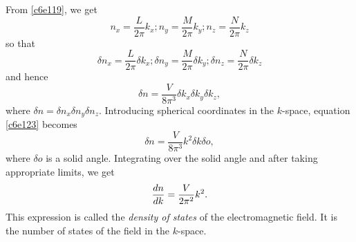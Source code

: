 \begin{enumerate}
From \eqref{c6e119}, we get
\[
n_x = \frac{L}{2\pi}k_x; n_y = \frac{M}{2\pi}k_y; n_z = \frac{N}{2\pi}k_z
\]
so that
\[
\delta n_x = \frac{L}{2\pi}\delta k_x; \delta n_y = \frac{M}{2\pi}\delta k_y; 
\delta n_z = \frac{N}{2\pi}\delta k_z
\]
and hence
\begin{equation}\label{c6e123}
\delta n = \frac{V}{8\pi^3}\delta k_x \delta k_y \delta k_z,
\end{equation}
where $\delta n = \delta n_x \delta n_y \delta n_z$. Introducing spherical 
coordinates in the $k$-space, equation \eqref{c6e123} becomes
\begin{equation}\label{c6e124}
\delta n = \frac{V}{8\pi^3}k^2 \delta k \delta o,
\end{equation}
where $\delta o$ is a solid angle. Integrating over the solid angle and after
taking appropriate limits, we get
\begin{equation}\label{c6e125}
\frac{d{n}}{d{k}} = \frac{V}{2\pi^2}k^2.
\end{equation}
This expression is called the \emph{density of states} of the electromagnetic
field. It is the number of states of the field in the $k$-space.


\end{enumerate}
